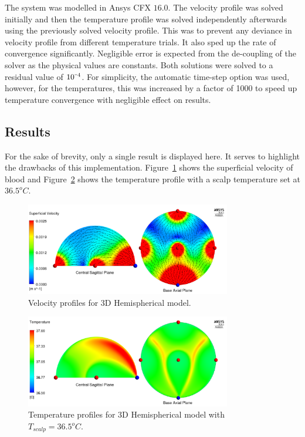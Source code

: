 \documentclass[11pt,english,a4paper,twoside,openright]{report}
\newcommand{\smallminus}{\scalebox{0.5}[1.0]{$-$}}
\begin{document}
{{{{{{{{The system was modelled in Ansys CFX $16.0$. The velocity profile was solved initially and then the temperature profile was solved independently afterwards using the previously solved velocity profile. This was to prevent any deviance in velocity profile from different temperature trials. It also sped up the rate of convergence significantly. Negligible error is expected from the de-coupling of the solver as the physical values are constants. Both solutions were solved to a residual value of $10^{\smallminus4}$. For simplicity, the automatic time-step option was used, however, for the temperatures, this was increased by a factor of 1000 to speed up temperature convergence with negligible effect on results. 

\subsection{Results}

For the sake of brevity, only a single result is displayed here. It serves to highlight the drawbacks of this implementation. Figure~\ref{fig:SuperficialVelocity} shows the superficial velocity of blood and Figure~\ref{fig:3DTemperature} shows the temperature profile with a scalp temperature set at $36.5^{o}C$.

\begin{figure}[h]
	\centering
	\includegraphics[width=0.8\textwidth]{3DHemisphere/SuperficialVelocity}
	\caption[Velocity profiles for 3D Hemispherical model]{Velocity profiles for 3D Hemispherical model.}
	\label{fig:SuperficialVelocity}
\end{figure}

\begin{figure}[h]
	\centering
	\includegraphics[width=0.8\textwidth]{3DHemisphere/Temperature2}
	\caption[Temperature profiles for 3D Hemispherical model with $T_{scalp}=36.5^{o}C$]{Temperature profiles for 3D Hemispherical model with $T_{scalp}=36.5^{o}C$.}
	\label{fig:3DTemperature}
\end{figure}

}}}}}}}}
\end{document}
